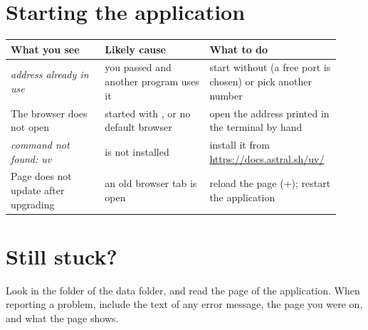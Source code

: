 \section{Starting the application}
\begin{longtable}{@{}L{0.27\linewidth}L{0.30\linewidth}L{0.35\linewidth}@{}}
\toprule
What you see & Likely cause & What to do\\ \midrule\endhead
\emph{address already in use} & you passed  and another program uses it & start without  (a free port is chosen) or pick another number\\
The browser does not open & started with , or no default browser & open the address printed in the terminal by hand\\
\emph{command not found: uv} &  is not installed & install it from \url{https://docs.astral.sh/uv/}\\
Page does not update after upgrading & an old browser tab is open & reload the page (+); restart the application\\
\bottomrule
\end{longtable}

\section{Still stuck?}
Look in the  folder of the data folder, and read the  page of the application. When reporting a problem, include
the text of any error message, the page you were on, and what the  page shows.
